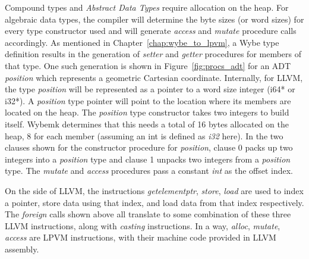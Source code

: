 Compound types and \textit{Abstract Data Types} require allocation on the heap.
For algebraic data types, the compiler will determine the byte sizes (or word
sizes) for every type constructor used and will generate \textit{access} and
\textit{mutate} procedure calls accordingly. As mentioned in
Chapter~\ref{chap:wybe_to_lpvm}, a Wybe type definition results in the
generation of \textit{setter} and \textit{getter} procedures for members of
that type. One such generation is shown in Figure~\ref{fig:procs_adt} for an
ADT \textit{position} which represents a geometric Cartesian
coordinate. Internally, for LLVM, the type \textit{position} will be
represented as a pointer to a word size integer (i64* or i32*). A
\textit{position} type pointer will point to the location where its members are
located on the heap. The \textit{position} type constructor takes two integers
to build itself. Wybemk determines that this needs a total of 16 bytes
allocated on the heap, 8 for each member (assuming an int is defined as
\textit{i32} here). In the two clauses shown for the constructor procedure for
\textit{position}, clause 0 packs up two integers into a \textit{position} type
and clause 1 unpacks two integers from a \textit{position} type. The
\textit{mutate} and \textit{access} procedures pass a constant \textit{int} as
the offset index.

On the side of LLVM, the instructions \textit{getelementptr}, \textit{store},
\textit{load} are used to index a pointer, store data using that index, and
load data from that index respectively. The \textit{foreign} calls shown above
all translate to some combination of these three LLVM instructions, along with
\textit{casting} instructions. In a way, \textit{alloc}, \textit{mutate},
\textit{access} are LPVM instructions, with their machine code provided in LLVM
assembly. 


